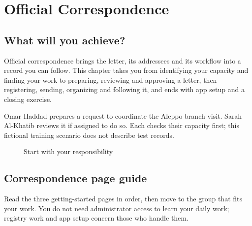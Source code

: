 \chapter{Official Correspondence}
\label{ch:correspondence}

\section{What will you achieve?}

Official correspondence brings the letter, its addressees and its workflow into a record you can follow. This chapter takes you from identifying your capacity and finding your work to preparing, reviewing and approving a letter, then registering, sending, organizing and following it, and ends with app setup and a closing exercise.

\begin{rcnote}
Omar Haddad prepares a request to coordinate the Aleppo branch visit. Sarah Al-Khatib reviews it if assigned to do so. Each checks their capacity first; this fictional training scenario does not describe test records.
\end{rcnote}

\begin{figure}[H]
\centering
{}
\rclegend
\caption{Start with your responsibility}
\label{fig:correspondence-start}
\end{figure}

\section{Correspondence page guide}
\label{sec:correspondence-pages}
Read the three getting-started pages in order, then move to the group that fits your work. You do not need administrator access to learn your daily work; registry work and app setup concern those who handle them.

